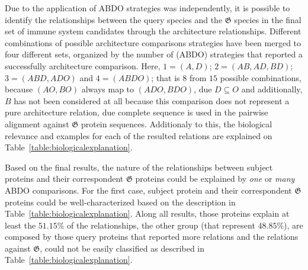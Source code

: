 \documentclass[11pt]{article}
\begin{document}
Due to the application of ABDO strategies was independently, it is possible to 
identify the relationships between the query species and the 
$\boldsymbol{\mathfrak{G}}$ species in the final set of immune system 
candidates through the architecture relationships. Different combinations of 
possible architecture comparisons strategies have been merged to four different 
sets, organized by the number of (ABDO) strategies that reported a successfully
architecture comparison. Here, $1 = (A, D)$; $2 = (AB, AD, BD)$; $3 = (ABD, ADO)$ 
and $4 = (ABDO)$; that is $8$ from $15$ possible combinations, because $ (AO, 
BO)$ always map to $ (ADO, BDO)$, due $D \subseteq O$ and additionally, $B$ has 
not been considered at all because this comparison does not represent a pure 
architecture relation, due complete sequence is used in the pairwise alignment 
against $\boldsymbol{\mathfrak{G}}$ protein sequences. Additionaly to this,
the biological relevance and examples for each of the resulted relations are
explained on Table~\ref{table:biologicalexplanation}.

Based on the final results, the nature of the relationships between subject 
proteins and their correspondent $\boldsymbol{\mathfrak{G}}$ proteins could be explained 
by \textit{one} or \textit{many} ABDO comparisons. For the first case, subject protein
and their correspondent $\boldsymbol{\mathfrak{G}}$ proteins could be well-characterized based
on the description in Table~\ref{table:biologicalexplanation}. Along all results, those
proteins explain at least the $51.15$\% of the relationships, the other group (that represent 
$48.85$\%), are composed by those query proteins that reported more relations and the relations against
$\boldsymbol{\mathfrak{G}}$, could not be easily classified as described in
Table~\ref{table:biologicalexplanation}. 
\end{document}
